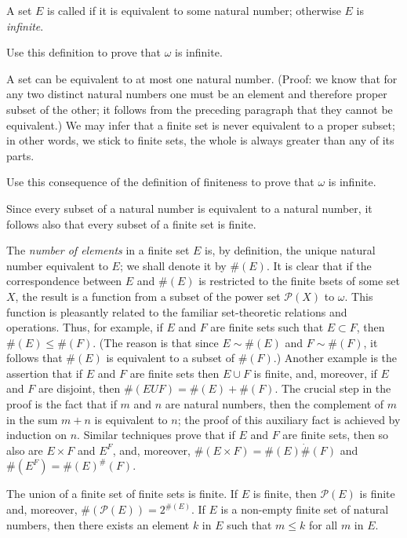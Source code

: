 A set $E$ is called  if it is equivalent to some natural number; otherwise $E$ is \textit{infinite}.
 
\begin{exercise} Use this definition to prove that $\omega$ is infinite.
\end{exercise}

A set can be equivalent to at most one natural number. (Proof: we know that for any two distinct natural numbers one must be an element and therefore proper subset of the other; it follows from the preceding paragraph that they cannot be equivalent.) We may infer that a finite set is never equivalent to a proper subset; in other words, we stick to finite sets, the whole is always greater than any of its parts. 

\begin{exercise}  Use this consequence of the definition of finiteness to prove that $\omega$ is infinite. 
\end{exercise}

Since every subset of a natural number is equivalent to a natural number, it follows also that every subset of a finite set is finite. 

The \textit{number of elements} in a finite set $E$ is, by definition, the unique natural number equivalent to $E$; we shall denote it by $\# (E)$. It is clear that if the correspondence between $E$ and $\# (E)$ is restricted to the finite bsets of some set $X$, the result is a function from a subset of the power set $\mathcal{P}(X)$ to $\omega$. This function is pleasantly related to the familiar set-theoretic relations and operations. Thus, for example, if $E$ and $F$ are finite sets such that $E \subset F$, then $\# (E) \le \# (F)$. (The reason is that since $E \sim \# (E)$ and $F \sim \# (F)$, it follows that $\# (E)$ is equivalent to a subset of $\# (F)$.) Another example is the assertion that if $E$ and $F$ are finite sets then $E \cup F$ is finite, and, moreover, if $E$ and $F$ are disjoint, then $\# (E U F) = \# (E) + \# (F)$. The crucial step in the proof is the fact that if $m$ and $n$ are natural numbers, then the complement of $m$ in the sum $m + n$ is equivalent to $n$; the proof of this auxiliary fact is achieved by induction on $n$. Similar techniques prove that if $E$ and $F$ are finite sets, then so also are $E \times F$ and $E^{F}$, and, moreover, $\# (E \times F) = \# (E) \dot \# (F)$ and  $\# (E^{F}) = \# (E)^\# (F)$. 

\begin{exercise} The union of a finite set of finite sets is finite. If $E$ is finite, then $\mathcal{P}(E)$ is finite and, moreover, $\# (\mathcal{P}(E)) = 2^{\# (E)}$. If $E$ is a non-empty finite set of natural numbers, then there exists an element $k$ in $E$ such that $m \le k$ for all $m$ in $E$. 
\end{exercise}

